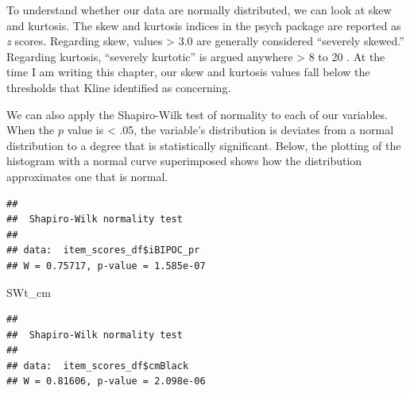 \documentclass[
]{book}
\newenvironment{Shaded}{\begin{snugshade}}{\end{snugshade}}
\newcommand{\CommentTok}[1]{\textcolor[rgb]{0.56,0.35,0.01}{\textit{#1}}}
\newcommand{\FunctionTok}[1]{\textcolor[rgb]{0.00,0.00,0.00}{#1}}
\newcommand{\NormalTok}[1]{#1}
\newcommand{\OtherTok}[1]{\textcolor[rgb]{0.56,0.35,0.01}{#1}}
\newcommand{\SpecialCharTok}[1]{\textcolor[rgb]{0.00,0.00,0.00}{#1}}
\begin{document}
To understand whether our data are normally distributed, we can look at skew and kurtosis. The skew and kurtosis indices in the psych package are reported as \emph{z} scores. Regarding skew, values \textgreater{} 3.0 are generally considered ``severely skewed.'' Regarding kurtosis, ``severely kurtotic'' is argued anywhere \textgreater{} 8 to 20 \citep{kline_principles_2016}. At the time I am writing this chapter, our skew and kurtosis values fall below the thresholds that Kline identified as concerning.

We can also apply the Shapiro-Wilk test of normality to each of our variables. When the \(p\) value is \textless{} .05, the variable's distribution is deviates from a normal distribution to a degree that is statistically significant. Below, the plotting of the histogram with a normal curve superimposed shows how the distribution approximates one that is normal.

\begin{Shaded}
\end{Shaded}

\begin{verbatim}
## 
##  Shapiro-Wilk normality test
## 
## data:  item_scores_df$iBIPOC_pr
## W = 0.75717, p-value = 1.585e-07
\end{verbatim}

\begin{Shaded}
\begin{Highlighting}[]
\NormalTok{SWt\_cm}
\end{Highlighting}
\end{Shaded}

\begin{verbatim}
## 
##  Shapiro-Wilk normality test
## 
## data:  item_scores_df$cmBlack
## W = 0.81606, p-value = 2.098e-06
\end{verbatim}
\end{document}
